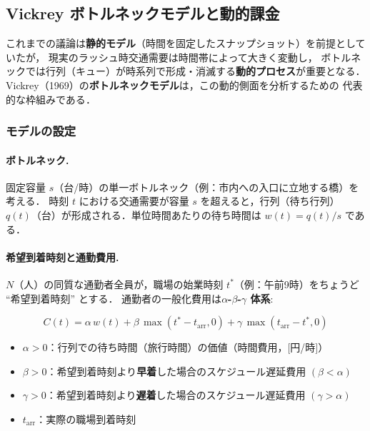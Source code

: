 \subsection{Vickrey ボトルネックモデルと動的課金}
\label{subsec:vickrey-bottleneck}

これまでの議論は\textbf{静的モデル}（時間を固定したスナップショット）を前提としていたが，
現実のラッシュ時交通需要は時間帯によって大きく変動し，
ボトルネックでは行列（キュー）が時系列で形成・消滅する\textbf{動的プロセス}が重要となる．
Vickrey（1969）の\textbf{ボトルネックモデル}は，この動的側面を分析するための
代表的な枠組みである\cite{Vickrey1969}．

\subsubsection*{モデルの設定}

\paragraph{ボトルネック.}
固定容量 $s$（台/時）の単一ボトルネック（例：市内への入口に立地する橋）を考える．
時刻 $t$ における交通需要が容量 $s$ を超えると，行列（待ち行列）
$q(t)$（台）が形成される．単位時間あたりの待ち時間は $w(t) = q(t)/s$ である．

\paragraph{希望到着時刻と通勤費用.}
$N$（人）の同質な通勤者全員が，職場の始業時刻 $t^*$（例：午前9時）をちょうど ``希望到着時刻'' とする．
通勤者の一般化費用は\textbf{$\alpha$-$\beta$-$\gamma$ 体系}\cite{Small1982,ArnottdePalmaLindsey1990}:

\begin{equation}
  C(t)
  = \alpha\, w(t)
  + \beta\, \max(t^* - t_{\text{arr}}, 0)
  + \gamma\, \max(t_{\text{arr}} - t^*, 0)
  \label{eq:abc-cost}
\end{equation}

\begin{itemize}
  \item $\alpha > 0$：行列での待ち時間（旅行時間）の価値（時間費用，$[$円/時$]$）
  \item $\beta > 0$：希望到着時刻より\textbf{早着}した場合のスケジュール遅延費用 $(\beta < \alpha)$
  \item $\gamma > 0$：希望到着時刻より\textbf{遅着}した場合のスケジュール遅延費用 $(\gamma > \alpha)$
  \item $t_{\text{arr}}$：実際の職場到着時刻
\end{itemize}

